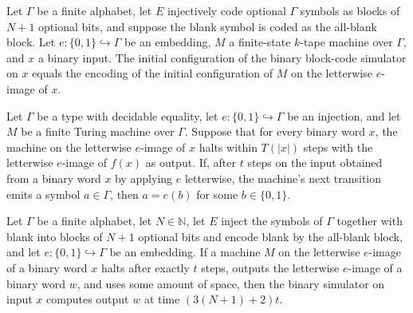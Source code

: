 \begin{lemma}
\label{Turing.FinTM.arCfg_init}
\leanok
{}
Let $\Gamma$ be a finite alphabet, let $E$ injectively code optional $\Gamma$
symbols as blocks of $N+1$ optional bits, and suppose the blank symbol is coded as the
all-blank block. Let $e:\{0,1\}\hookrightarrow\Gamma$ be an embedding, $M$ a
finite-state $k$-tape machine over $\Gamma$, and $x$ a binary input. The initial
configuration of the binary block-code simulator on $x$ equals the encoding of the
initial configuration of $M$ on the letterwise $e$-image of $x$.
\end{lemma}

\begin{lemma}
\label{Turing.FinTM.arEmission_in_image}
\leanok
{}
Let $\Gamma$ be a type with decidable equality, let $e:\{0,1\}\hookrightarrow\Gamma$ be
an injection, and let $M$ be a finite Turing machine over $\Gamma$. Suppose that for
every binary word $x$, the machine on the letterwise $e$-image of $x$ halts within
$T(|x|)$ steps with the letterwise $e$-image of $f(x)$ as output. If, after $t$ steps on
the input obtained from a binary word $x$ by applying $e$ letterwise, the machine's next
transition emits a symbol $a\in\Gamma$, then $a=e(b)$ for some $b\in\{0,1\}$.
\end{lemma}

\begin{lemma}
\label{Turing.FinTM.arTM_computes}
\leanok
{}
Let $\Gamma$ be a finite alphabet, let $N\in\mathbb{N}$, let $E$ inject the symbols of
$\Gamma$ together with blank into blocks of $N+1$ optional bits and encode blank by the
all-blank block, and let $e:\{0,1\}\hookrightarrow\Gamma$ be an embedding. If a machine
$M$ on the letterwise $e$-image of a binary word $x$ halts after exactly $t$ steps,
outputs the letterwise $e$-image of a binary word $w$, and uses some amount of space,
then the binary simulator on input $x$ computes output $w$ at time $(3(N+1)+2)t$.
\end{lemma}


